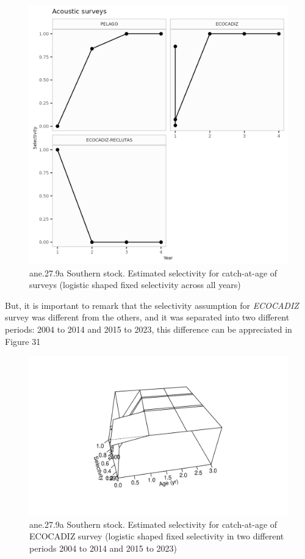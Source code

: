 \documentclass[
]{article}
\begin{document}
\begin{figure}[H]

{\centering \includegraphics[width=0.95\linewidth]{report/run/S1.0_4FLEETS_SelECO_RecIndex_Mnewfix/fig_Sel_surveys} 

}

\caption{ane.27.9a Southern stock. Estimated selectivity for catch-at-age of surveys (logistic shaped fixed selectivity across all years)}\label{fig:unnamed-chunk-36}
\end{figure}

But, it is important to remark that the selectivity assumption for
\emph{ECOCADIZ} survey was different from the others, and it was
separated into two different periods: 2004 to 2014 and 2015 to 2023,
this difference can be appreciated in Figure 31

\begin{figure}[H]

{\centering \includegraphics[width=0.95\linewidth]{output/run/S1.0_4FLEETS_SelECO/plots//sel11_timevary_surf_flt6sex1} 

}

\caption{ane.27.9a Southern stock. Estimated selectivity for catch-at-age of ECOCADIZ survey (logistic shaped fixed selectivity in two different periods 2004 to 2014 and 2015 to 2023)}\label{fig:unnamed-chunk-37}
\end{figure}
\end{document}
